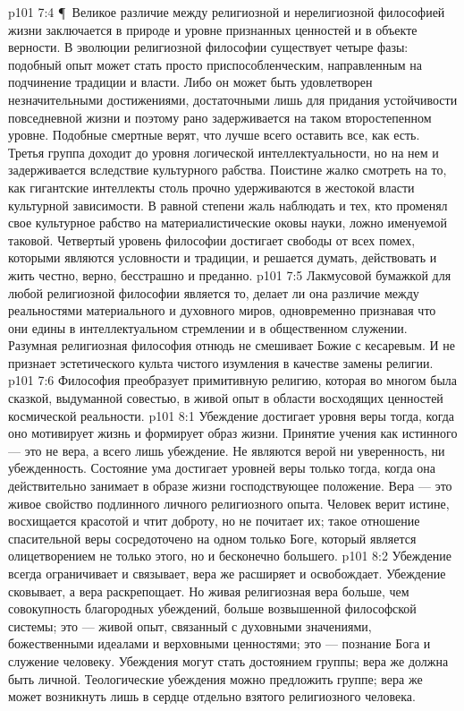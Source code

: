 \vs p101 7:4 \P\ Великое различие между религиозной и нерелигиозной философией жизни заключается в природе и уровне признанных ценностей и в объекте верности. В эволюции религиозной философии существует четыре фазы: подобный опыт может стать просто приспособленческим, направленным на подчинение традиции и власти. Либо он может быть удовлетворен незначительными достижениями, достаточными лишь для придания устойчивости повседневной жизни и поэтому рано задерживается на таком второстепенном уровне. Подобные смертные верят, что лучше всего оставить все, как есть. Третья группа доходит до уровня логической интеллектуальности, но на нем и задерживается вследствие культурного рабства. Поистине жалко смотреть на то, как гигантские интеллекты столь прочно удерживаются в жестокой власти культурной зависимости. В равной степени жаль наблюдать и тех, кто променял свое культурное рабство на материалистические оковы науки, ложно именуемой таковой. Четвертый уровень философии достигает свободы от всех помех, которыми являются условности и традиции, и решается думать, действовать и жить честно, верно, бесстрашно и преданно.
\vs p101 7:5 Лакмусовой бумажкой для любой религиозной философии является то, делает ли она различие между реальностями материального и духовного миров, одновременно признавая что они едины в интеллектуальном стремлении и в общественном служении. Разумная религиозная философия отнюдь не смешивает Божие с кесаревым. И не признает эстетического культа чистого изумления в качестве замены религии.
\vs p101 7:6 Философия преобразует примитивную религию, которая во многом была сказкой, выдуманной совестью, в живой опыт в области восходящих ценностей космической реальности.
\vs p101 8:1 Убеждение достигает уровня веры тогда, когда оно мотивирует жизнь и формирует образ жизни. Принятие учения как истинного --- это не вера, а всего лишь убеждение. Не являются верой ни уверенность, ни убежденность. Состояние ума достигает уровней веры только тогда, когда она действительно занимает в образе жизни господствующее положение. Вера --- это живое свойство подлинного личного религиозного опыта. Человек верит истине, восхищается красотой и чтит доброту, но не почитает их; такое отношение спасительной веры сосредоточено на одном только Боге, который является олицетворением не только этого, но и бесконечно большего.
\vs p101 8:2 Убеждение всегда ограничивает и связывает, вера же расширяет и освобождает. Убеждение сковывает, а вера раскрепощает. Но живая религиозная вера больше, чем совокупность благородных убеждений, больше возвышенной философской системы; это --- живой опыт, связанный с духовными значениями, божественными идеалами и верховными ценностями; это --- познание Бога и служение человеку. Убеждения могут стать достоянием группы; вера же должна быть личной. Теологические убеждения можно предложить группе; вера же может возникнуть лишь в сердце отдельно взятого религиозного человека.
